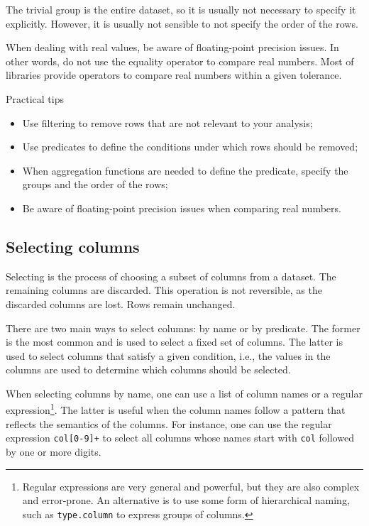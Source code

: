 The trivial group is the entire dataset, so it is usually not necessary to specify it
explicitly.  However, it is usually not sensible to not specify the order of the rows.

When dealing with real values, be aware of floating-point precision issues.  In other
words, do not use the equality operator to compare real numbers.  Most of libraries
provide operators to compare real numbers within a given tolerance.

\begin{hlbox}{Practical tips}
  \begin{itemize}
    \item Use filtering to remove rows that are not relevant to your analysis;
    \item Use predicates to define the conditions under which rows should be removed;
    \item When aggregation functions are needed to define the predicate, specify the groups and
      the order of the rows;
    \item Be aware of floating-point precision issues when comparing real numbers.
  \end{itemize}
\end{hlbox}

\subsection{Selecting columns}

Selecting is the process of choosing a subset of columns from a dataset.  The remaining
columns are discarded.  This operation is not reversible, as the discarded columns are
lost.  Rows remain unchanged.

There are two main ways to select columns: by name or by predicate.  The former is the
most common and is used to select a fixed set of columns.  The latter is used to select
columns that satisfy a given condition, i.e., the values in the columns are used to
determine which columns should be selected.

When selecting columns by name, one can use a list of column names or a regular
expression\footnote{Regular expressions are very general and powerful, but they are also
complex and error-prone.  An alternative is to use some form of hierarchical naming,
such as \texttt{type.column} to express groups of columns.}.
The latter is useful when the column names follow a pattern that reflects the semantics of
the columns.  For instance,
one can use the regular expression \texttt{col[0-9]+} to select all columns whose names
start with \texttt{col} followed by one or more digits.

